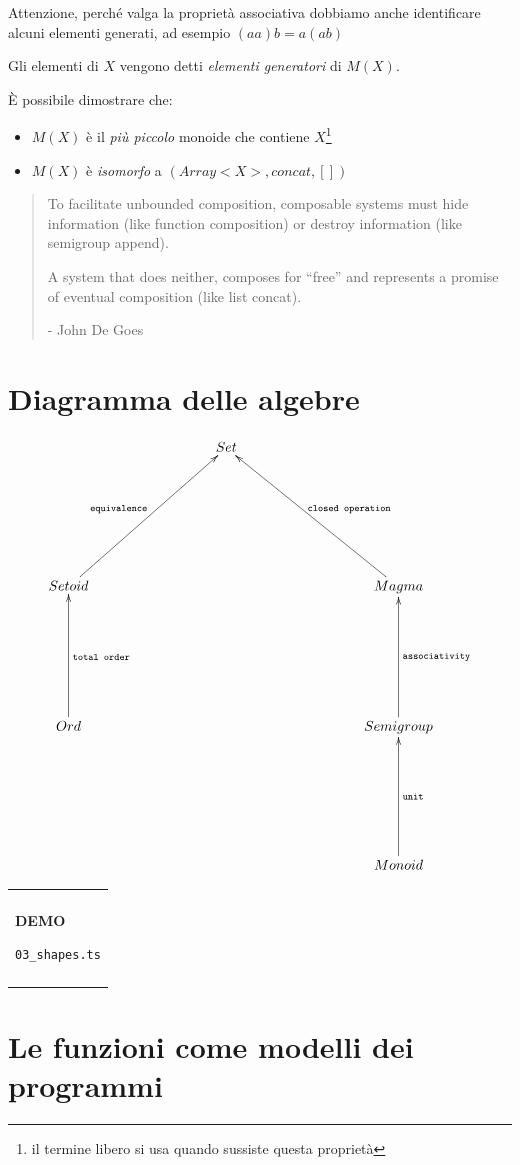 \documentclass[12pt]{article}
\theoremstyle{definition}
\newenvironment{demo}
    {\begin{center}
    \begin{tabular}{|p{0.9\textwidth}|}
    \hline\\
    }
    {
    \\\\\hline
    \end{tabular}
    \end{center}
    }
\begin{document}
Attenzione, perché valga la proprietà associativa dobbiamo anche identificare alcuni elementi generati, ad esempio $(aa)b = a(ab)$

Gli elementi di $X$ vengono detti \emph{elementi generatori} di $M(X)$.

È possibile dimostrare che:

\begin{itemize}
  \item $M(X)$ è il \emph{più piccolo} monoide che contiene $X$\footnote{il termine libero si usa quando sussiste questa proprietà}
  \item $M(X)$ è \emph{isomorfo} a $(Array<X>, concat, [])$
\end{itemize}

\begin{quote}
To facilitate unbounded composition, composable systems must hide information (like function composition) or destroy information
(like semigroup append).

A system that does neither, composes for “free” and represents a promise of eventual composition (like list concat).

- John De Goes
\end{quote}

\section{Diagramma delle algebre}

\[
\xymatrixrowsep{3cm}
\xymatrixcolsep{3cm}
\xymatrix{
  & Set \\
  Setoid \ar[ur]^{\texttt{equivalence}} & & Magma \ar[ul]_{\texttt{closed operation}} \\
  Ord \ar[u]_{\texttt{total order}} & & Semigroup \ar[u]_{\texttt{associativity}} \\
  & & Monoid \ar[u]_{\texttt{unit}} \\
}
\]

\begin{demo}
\begin{center}
\textbf{DEMO}

\texttt{03\_shapes.ts}
\end{center}
\end{demo}

\newpage

\section{Le funzioni come modelli dei programmi}
\end{document}
